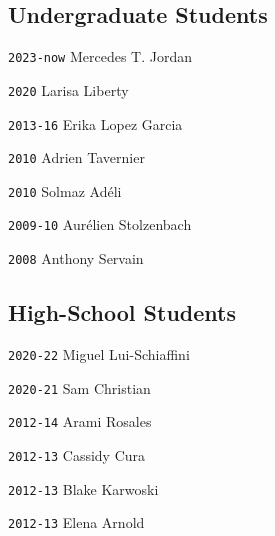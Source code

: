 \begin{multicols}{2}

\vspace{-1em}
\subsection*{Undergraduate Students}

\noindent \texttt{2023-now} \tab Mercedes T. Jordan

\noindent \texttt{2020} \tab Larisa Liberty

\noindent \texttt{2013-16} \tab Erika Lopez Garcia

\noindent \texttt{2010} \tab Adrien Tavernier

\noindent \texttt{2010} \tab Solmaz Adéli

\noindent \texttt{2009-10} \tab Aurélien Stolzenbach

\noindent \texttt{2008} \tab Anthony Servain

\columnbreak
\vspace{-1em}
\subsection*{High-School Students}

\noindent \texttt{2020-22} \tab Miguel Lui-Schiaffini

\noindent \texttt{2020-21} \tab Sam Christian

\noindent \texttt{2012-14} \tab Arami Rosales

\noindent \texttt{2012-13} \tab Cassidy Cura

\noindent \texttt{2012-13} \tab Blake Karwoski

\noindent \texttt{2012-13} \tab Elena Arnold

\end{multicols}